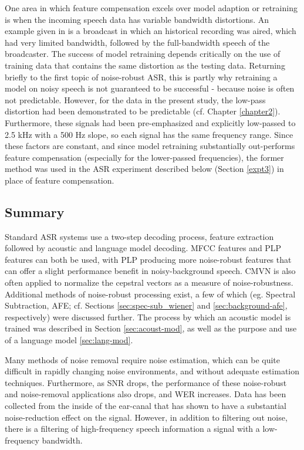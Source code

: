 One area in which feature compensation excels over model adaption or retraining is when the incoming speech data has variable bandwidth distortions.  An example given in \cite{morales:09} is a broadcast in which an historical recording was aired, which had very limited bandwidth, followed by the full-bandwidth speech of the broadcaster.  The success of model retraining depends critically on the use of training data that contains the same distortion as the testing data.  Returning briefly to the first topic of noise-robust ASR, this is partly why retraining a model on noisy speech is not guaranteed to be successful - because noise is often not predictable. However, for the data in the present study, the low-pass distortion had been demonstrated to be predictable (cf. Chapter \ref{chapter2}).  Furthermore, these signals had been pre-emphasized and explicitly low-passed to 2.5 kHz with a 500 Hz slope, so each signal has the same frequency range.  Since these factors are constant, and since model retraining substantially out-performs feature compensation (especially for the lower-passed frequencies), the former method was used in the ASR experiment described below (Section \ref{expt3}) in place of feature compensation.

\subsection{Summary}

Standard ASR systems use a two-step decoding process, feature extraction followed by acoustic and language model decoding.  MFCC features and PLP features can both be used, with PLP producing more noise-robust features that can offer a slight performance benefit in noisy-background speech.  CMVN is also often applied to normalize the cepstral vectors as a measure of noise-robustness.  Additional methods of noise-robust processing exist, a few of which (eg. Spectral Subtraction, AFE; cf. Sections \ref{sec:spec-sub_wiener} and \ref{sec:background-afe}, respectively) were discussed further. The process by which an acoustic model is trained was described in Section \ref{sec:acoust-mod}, as well as the purpose and use of a language model \ref{sec:lang-mod}.

Many methods of noise removal require noise estimation, which can be quite difficult in rapidly changing noise environments, and without adequate estimation techniques. Furthermore, as SNR drops, the performance of these noise-robust and noise-removal applications also drops, and WER increases.  Data has been collected from the inside of the ear-canal that has shown to have a substantial noise-reduction effect on the signal.  However, in addition to filtering out noise, there is a filtering of high-frequency speech information a signal with a low-frequency bandwidth.

